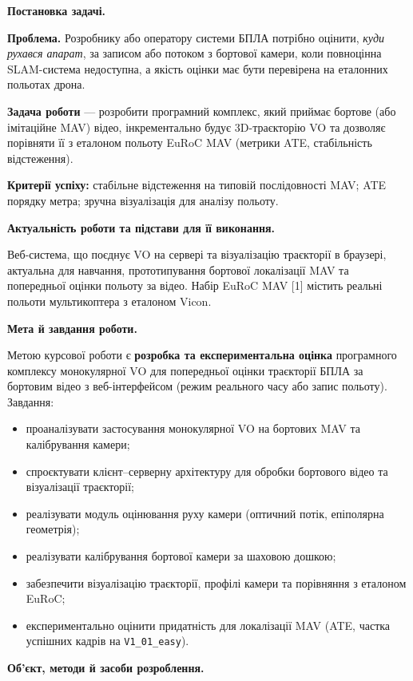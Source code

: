 \documentclass[14pt,a4paper,openany]{extreport}
\newcommand{\introheading}[1]{%
  \par\addvspace{0.5\baselineskip}%
  \noindent\textbf{#1}\par
}
\begin{document}
\introheading{Постановка задачі.}

\textbf{Проблема.} Розробнику або оператору системи БПЛА потрібно оцінити, \emph{куди рухався апарат}, за записом або потоком з бортової камери, коли повноцінна SLAM-система недоступна, а якість оцінки має бути перевірена на еталонних польотах дрона.

\textbf{Задача роботи} --- розробити програмний комплекс, який приймає бортове (або імітаційне MAV) відео, інкрементально будує 3D-траєкторію VO та дозволяє порівняти її з еталоном польоту EuRoC MAV (метрики ATE, стабільність відстеження).

\textbf{Критерії успіху:} стабільне відстеження на типовій послідовності MAV; ATE порядку метра; зручна візуалізація для аналізу польоту.

\introheading{Актуальність роботи та підстави для її виконання.}

Веб-система, що поєднує VO на сервері та візуалізацію траєкторії в браузері, актуальна для навчання, прототипування бортової локалізації MAV та попередньої оцінки польоту за відео. Набір EuRoC MAV [1] містить реальні польоти мультикоптера з еталоном Vicon.

\introheading{Мета й завдання роботи.}

Метою курсової роботи є \textbf{розробка та експериментальна оцінка} програмного комплексу монокулярної VO для попередньої оцінки траєкторії БПЛА за бортовим відео з веб-інтерфейсом (режим реального часу або запис польоту). Завдання:

\begin{itemize}[leftmargin=\parindent, itemsep=0pt]
  \item проаналізувати застосування монокулярної VO на бортових MAV та калібрування камери;
  \item спроєктувати клієнт--серверну архітектуру для обробки бортового відео та візуалізації траєкторії;
  \item реалізувати модуль оцінювання руху камери (оптичний потік, епіполярна геометрія);
  \item реалізувати калібрування бортової камери за шаховою дошкою;
  \item забезпечити візуалізацію траєкторії, профілі камери та порівняння з еталоном EuRoC;
  \item експериментально оцінити придатність для локалізації MAV (ATE, частка успішних кадрів на \texttt{V1\_01\_easy}).
\end{itemize}

\introheading{Об'єкт, методи й засоби розроблення.}
\end{document}
